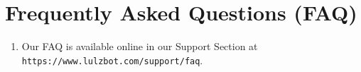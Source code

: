 %
%
%
%
%

\section{Frequently Asked Questions (FAQ)}
\begin{enumerate}
\item Our FAQ is available online in our Support Section at \texttt{https://www.lulzbot.com/support/faq}.
\end{enumerate}
